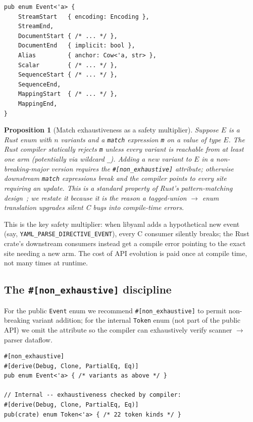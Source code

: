 \documentclass[12pt]{article}
\newtheorem{proposition}[theorem]{Proposition}
\theoremstyle{definition}
\theoremstyle{remark}
\begin{document}
\begin{lstlisting}
pub enum Event<'a> {
    StreamStart   { encoding: Encoding },
    StreamEnd,
    DocumentStart { /* ... */ },
    DocumentEnd   { implicit: bool },
    Alias         { anchor: Cow<'a, str> },
    Scalar        { /* ... */ },
    SequenceStart { /* ... */ },
    SequenceEnd,
    MappingStart  { /* ... */ },
    MappingEnd,
}
\end{lstlisting}

\begin{proposition}[Match exhaustiveness as a safety multiplier]
\label{thm:exhaustiveness}
Suppose $E$ is a Rust enum with $n$ variants and a \texttt{match} expression
\texttt{m} on a value of type $E$. The Rust compiler statically rejects
\texttt{m} unless every variant is reachable from at least one arm
(potentially via wildcard \texttt{\_}). Adding a new variant to $E$ in a
non-breaking-major version requires the \texttt{\#[non\_exhaustive]}
attribute; otherwise downstream \texttt{match} expressions break and the
compiler points to every site requiring an update. This is a standard
property of Rust's pattern-matching design~\cite{rustbelt}; we restate
it because it is the reason a tagged-union $\to$ enum translation
upgrades silent C bugs into compile-time errors.
\end{proposition}

This is the key safety multiplier: when libyaml adds a hypothetical new
event (say, \texttt{YAML\_PARSE\_DIRECTIVE\_\allowbreak EVENT}), every
C consumer silently breaks; the Rust crate's downstream consumers
instead get a compile error pointing to the exact site needing a new
arm. The cost of API evolution is paid once at compile time, not many
times at runtime.

\subsection{The \texttt{\#[non\_exhaustive]} discipline}

For the public \texttt{Event} enum we recommend \texttt{\#[non\_exhaustive]}
to permit non-breaking variant addition; for the internal \texttt{Token}
enum (not part of the public API) we omit the attribute so the compiler can
exhaustively verify scanner $\to$ parser dataflow.

\begin{lstlisting}
#[non_exhaustive]
#[derive(Debug, Clone, PartialEq, Eq)]
pub enum Event<'a> { /* variants as above */ }

// Internal -- exhaustiveness checked by compiler:
#[derive(Debug, Clone, PartialEq, Eq)]
pub(crate) enum Token<'a> { /* 22 token kinds */ }
\end{lstlisting}
\end{document}
